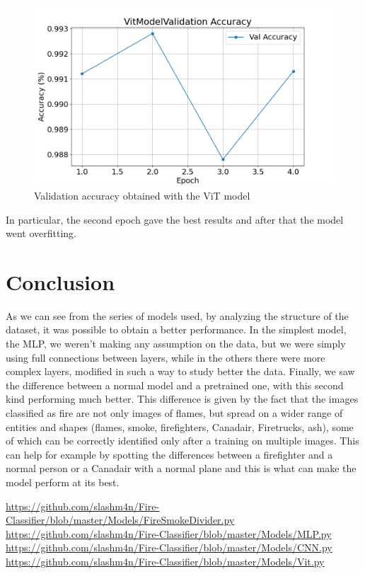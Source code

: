 \documentclass[11pt,journal]{IEEEtran}
\begin{document}
\begin{figure}[ht]
	\renewcommand{\arraystretch}{2.0}
	\label{VitModel_Val_Accuracy}
	\centering
	\includegraphics[width=\linewidth]{VitModel_Val_Accuracy}
	\caption{Validation accuracy obtained with the ViT model}
\end{figure}
In particular, the second epoch gave the best results and after that the model went overfitting.
\section{Conclusion}
As we can see from the series of models used, by analyzing the structure of the dataset, it was possible to obtain a better performance. In the simplest model, the MLP, we weren't making any assumption on the data, but we were simply using full connections between layers, while in the others there were more complex layers, modified in such a way to study better the data.
Finally, we saw the difference between a normal model and a pretrained one, with this second kind performing much better. This difference is given by the fact that the images classified as fire are not only images of flames, but spread on a wider range of entities and shapes (flames, smoke, firefighters, Canadair, Firetrucks, ash), some of which can be correctly identified only after a training on multiple images. This can help for example by spotting the differences between a firefighter and a normal person or a Canadair with a normal plane and this is what can make the model perform at its best.


\begin{thebibliography}{9}
	\url{https://github.com/slashm4n/Fire-Classifier/blob/master/Models/FireSmokeDivider.py}
	\url{https://github.com/slashm4n/Fire-Classifier/blob/master/Models/MLP.py}
	\url{https://github.com/slashm4n/Fire-Classifier/blob/master/Models/CNN.py}
	\url{https://github.com/slashm4n/Fire-Classifier/blob/master/Models/Vit.py}
\end{thebibliography}
\end{document}

